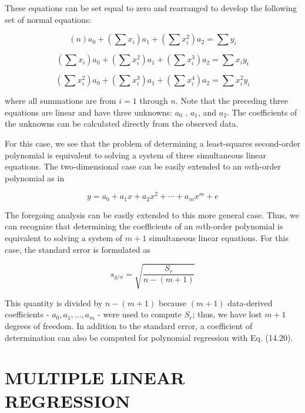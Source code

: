 \documentclass[../main.tex]{subfiles}
\begin{document}
\noindent These equations can be set equal to zero and rearranged to develop the following set of normal equations:

\begin{equation}
	(n)a_0 + (\sum x_i) a_1 + (\sum x^2_i) a_2 = \sum y_i
\end{equation}

\begin{equation}
	(\sum x_i)a_0 + (\sum x_i ^ 2) a_1 + (\sum x^3_i) a_2 = \sum x_i y_i
\end{equation}

\begin{equation}
	(\sum x_i^2)a_0 + (\sum x_i ^ 3) a_1 + (\sum x^4_i) a_2 = \sum x_i^2 y_i
\end{equation}

\noindent where all summations are from $i = 1$ through $n$. Note that the preceding three equations are linear and have three unknowns: $a_0$ , $a_1$, and $a_2$. The coefficients of the unknowns can be calculated directly from the observed data.

For this case, we see that the problem of determining a least-squares second-order polynomial is equivalent to solving a system of three simultaneous linear equations. The two-dimensional case can be easily extended to an $m$th-order polynomial as in

\begin{equation}
	y = a_0 + a_1 x + a_2 x^2 + \cdots + a_m x^m + e
\end{equation}

The foregoing analysis can be easily extended to this more general case. Thus, we can recognize that determining the coefficients of an $m$th-order polynomial is equivalent to solving a system of $m + 1$ simultaneous linear equations. For this case, the standard error is formulated as

\begin{equation}
	\tag{15.3}
	s_{y/x} = \sqrt{\frac{S_r}{n - (m + 1)}}
\end{equation}

This quantity is divided by $n - (m + 1)$ because $(m + 1)$ data-derived coefficients - $a_0, a_1, ..., a_m$ - were used to compute $S_r$; thus, we have lost $m + 1$ degrees of freedom. In addition to the standard error, a coefficient of determination can also be computed for polynomial regression with Eq. (14.20).


\label{cha:cha_P_15_2} %
\section{MULTIPLE LINEAR REGRESSION}
\end{document}
